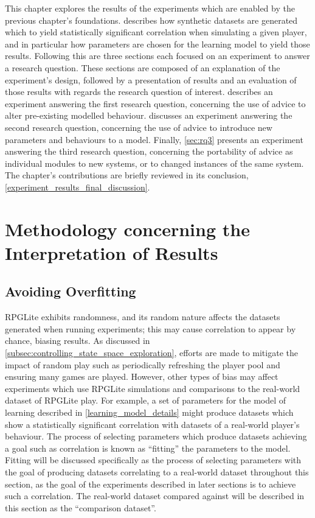This chapter explores the results of the experiments which are enabled by the
previous chapter's foundations.  describes how
synthetic datasets are generated which to yield statistically significant
correlation when simulating a given player, and in particular how parameters are
chosen for the learning model to yield those results. Following this are three
sections each focused on an experiment to answer a research question. These
sections are composed of an explanation of the experiment's design, followed by
a presentation of results and an evaluation of those results with regards the
research question of interest.  describes an experiment answering
the first research question, concerning the use of advice to alter pre-existing
modelled behaviour.  discusses an experiment answering the second 
research question, concerning the use of advice to introduce new parameters and
behaviours to a model. Finally, \cref{sec:rq3} presents an experiment answering the
third research question, concerning the portability of advice as individual
modules to new systems, or to changed instances of the same system. The
chapter's contributions are briefly reviewed in its conclusion,
\cref{experiment_results_final_discussion}.


\section{Methodology concerning the Interpretation of Results}
\label{methodology_explained}

\subsection{Avoiding Overfitting}

RPGLite exhibits randomness, and its random nature affects the datasets
generated when running experiments; this may cause correlation to appear by
chance, biasing results. As discussed in
\cref{subsec:controlling_state_space_exploration}, efforts are made to mitigate
the impact of random play such as periodically refreshing the player pool and
ensuring many games are played. However, other types of bias may affect
experiments which use RPGLite simulations and comparisons to the real-world
dataset of RPGLite play. For example, a set of parameters for the model of
learning described in \cref{learning_model_details} might produce datasets which
show a statistically significant correlation with datasets of a real-world
player's behaviour. The process of selecting parameters which produce datasets
achieving a goal such as correlation is known as ``fitting'' the parameters to
the model. Fitting will be discussed specifically as the process of selecting
parameters with the goal of producing datasets correlating to a real-world
dataset throughout this section, as the goal of the experiments described in
later sections is to achieve such a correlation. The real-world dataset compared
against will be described in this section as the ``comparison dataset''.

